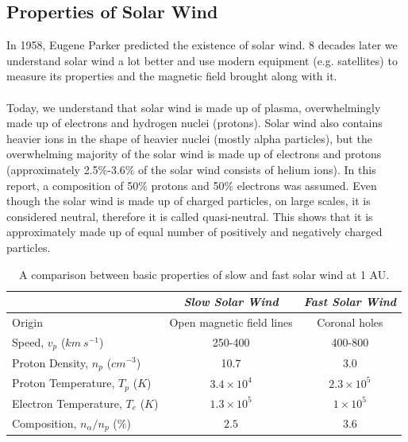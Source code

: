 \documentclass[11pt]{article}
\begin{document}
    \subsection{Properties of Solar Wind}\label{sec:solarwind}
        In 1958, Eugene Parker predicted the existence of solar wind\cite{1958parker}. 8 decades later we understand solar wind a lot better and use modern equipment (e.g. satellites) to measure its properties and the magnetic field brought along with it.\\ \\
        Today, we understand that solar wind is made up of plasma, overwhelmingly made up of electrons and hydrogen nuclei (protons). Solar wind also contains heavier ions in the shape of heavier nuclei (mostly alpha particles), but the overwhelming majority of the solar wind is made up of electrons and protons (approximately 2.5\%-3.6\% of the solar wind consists of helium ions\cite{2006schwenn}). In this report, a composition of 50\% protons and 50\% electrons was assumed. Even though the solar wind is made up of charged particles, on large scales, it is considered neutral, therefore it is called quasi-neutral\cite{2007meyer}. This shows that it is approximately made up of equal number of positively and negatively charged particles.\\
        \begin{table}[t!]
            \begin{center}
                \begin{tabular}{|l|c|c|} \hline
                    &\textit{Slow Solar Wind}&\textit{Fast Solar Wind}\\ \hline
                    Origin&Open magnetic field lines&Coronal holes\\ \hline
                    Speed, $v_p$ ($km\ s^{-1}$)&250-400&400-800\\ \hline
                    Proton Density, $n_p$ ($cm^{-3}$)&10.7&3.0\\ \hline
                    Proton Temperature, $T_p$ ($K$)&$3.4\times 10^4$&$2.3\times 10^5$\\ \hline
                    Electron Temperature, $T_e$ ($K$)&$1.3\times 10^5$&$1\times 10^5$\\ \hline
                    Composition, $n_\alpha /n_p$ ($\%$)&$2.5$&$3.6$\\ \hline
                \end{tabular}
                \caption{A comparison between basic properties of slow and fast solar wind at 1 AU.\cite{2006schwenn} \label{tab:slowfast}}
            \end{center}
        \end{table}\\
\end{document}
